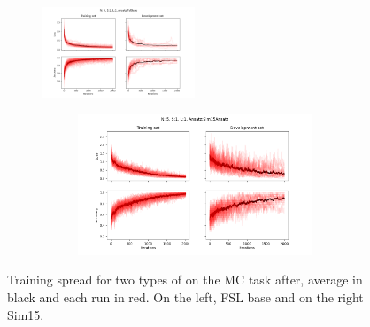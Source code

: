 \begin{figure}
\begin{subfigure}[b]{.49\textwidth}
\end{subfigure}\\
\begin{subfigure}[b]{\textwidth}
    \centering
    \includegraphics[width=0.5\textwidth]{figures/single_model/FslBase/Epochs_2000--A_0.05--N_5--S_1--L_1--Ansatz_FslBase.png}
\begin{subfigure}[b]{.49\textwidth}
    \centering
    \includegraphics[width=\textwidth]{figures/single_model/Sim15Ansatz/Epochs_2000--A_0.05--N_5--S_1--L_1.png}
\end{subfigure}
\end{subfigure}
\caption[Spread of \mya for small datasets]{\label{fig:testspread} Training spread for two types of \mya on the MC task after, average in black and each run in red. On the left, FSL base and on the right Sim15.}
\end{figure}